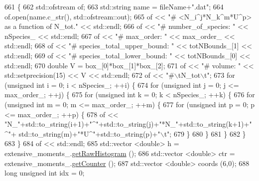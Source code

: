 \begin{DoxyCode}
661                                                                                \{
662     std::ofstream of;
663     std::string name = fileName+\textcolor{stringliteral}{".dat"};
664     of.open(name.c\_str(), std::ofstream::out);
665     of << \textcolor{stringliteral}{"# <N\_i^j*N\_k^m*U^p> as a function of N\_tot."} << std::endl;
666     of << \textcolor{stringliteral}{"# number\_of\_species: "} << nSpecies\_ << std::endl;
667     of << \textcolor{stringliteral}{"# max\_order: "} << max\_order\_ << std::endl;
668     of << \textcolor{stringliteral}{"# species\_total\_upper\_bound: "} << totNBounds\_[1] << std::endl;
669     of << \textcolor{stringliteral}{"# species\_total\_lower\_bound: "} << totNBounds\_[0] << std::endl;
670     \textcolor{keywordtype}{double} V = box\_[0]*box\_[1]*box\_[2];
671     of << \textcolor{stringliteral}{"# volume: "} << std::setprecision(15) << V << std::endl;
672     of << \textcolor{stringliteral}{"#\(\backslash\)tN\_tot\(\backslash\)t"};
673     \textcolor{keywordflow}{for} (\textcolor{keywordtype}{unsigned} \textcolor{keywordtype}{int} i = 0; i < nSpecies\_; ++i) \{
674         \textcolor{keywordflow}{for} (\textcolor{keywordtype}{unsigned} \textcolor{keywordtype}{int} j = 0; j <= max\_order\_; ++j) \{
675             \textcolor{keywordflow}{for} (\textcolor{keywordtype}{unsigned} \textcolor{keywordtype}{int} k = 0; k < nSpecies\_; ++k) \{
676                 \textcolor{keywordflow}{for} (\textcolor{keywordtype}{unsigned} \textcolor{keywordtype}{int} m = 0; m <= max\_order\_; ++m) \{
677                     \textcolor{keywordflow}{for} (\textcolor{keywordtype}{unsigned} \textcolor{keywordtype}{int} p = 0; p <= max\_order\_; ++p) \{
678                         of << \textcolor{stringliteral}{"N\_"}+std::to\_string(i+1)+\textcolor{stringliteral}{"^"}+std::to\_string(j)+\textcolor{stringliteral}{"*N\_"}+std::to\_string(k+1)+\textcolor{stringliteral}{"^"}+
      std::to\_string(m)+\textcolor{stringliteral}{"*U^"}+std::to\_string(p)+\textcolor{stringliteral}{"\(\backslash\)t"};
679                     \}
680                 \}
681             \}
682         \}
683     \}
684     of << std::endl;
685     std::vector <double> h = extensive\_moments\_.\hyperlink{classhistogram_a3a75adbce72057f3a4db805d9efc3c9c}{getRawHistogram} ();
686     std::vector <double> ctr = extensive\_moments\_.\hyperlink{classhistogram_a8417c827c4653055b370786916c901cf}{getCounter} ();
687     std::vector <double> coords (6,0);
688     \textcolor{keywordtype}{long} \textcolor{keywordtype}{unsigned} \textcolor{keywordtype}{int} idx = 0;

\end{DoxyCode}
